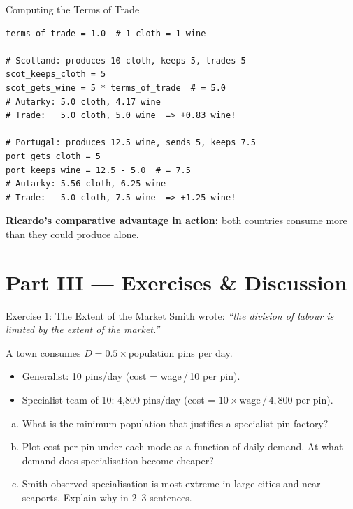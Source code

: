 \documentclass[aspectratio=169, 10pt]{beamer}
\begin{document}
\begin{frame}[fragile]{Computing the Terms of Trade}
\begin{lstlisting}
terms_of_trade = 1.0  # 1 cloth = 1 wine

# Scotland: produces 10 cloth, keeps 5, trades 5
scot_keeps_cloth = 5
scot_gets_wine = 5 * terms_of_trade  # = 5.0
# Autarky: 5.0 cloth, 4.17 wine
# Trade:   5.0 cloth, 5.0 wine  => +0.83 wine!

# Portugal: produces 12.5 wine, sends 5, keeps 7.5
port_gets_cloth = 5
port_keeps_wine = 12.5 - 5.0  # = 7.5
# Autarky: 5.56 cloth, 6.25 wine
# Trade:   5.0 cloth, 7.5 wine  => +1.25 wine!
\end{lstlisting}
\vspace{0.3em}
\textbf{Ricardo's comparative advantage in action:}
both countries consume more than they could produce alone.
\end{frame}

\section{Part III --- Exercises \& Discussion}

\begin{frame}{Exercise 1: The Extent of the Market}
Smith wrote: \textit{``the division of labour is limited by the extent
of the market.''}
\vspace{0.5em}

A town consumes $D = 0.5 \times \text{population}$ pins per day.
\begin{itemize}
  \item Generalist: 10 pins/day (cost = wage\,/\,10 per pin).
  \item Specialist team of 10: 4{,}800 pins/day
        (cost = $10 \times \text{wage}\,/\,4{,}800$ per pin).
\end{itemize}
\vspace{0.3em}
\begin{enumerate}[(a)]
  \item What is the minimum population that justifies a specialist
        pin factory?
  \item Plot cost per pin under each mode as a function of daily
        demand. At what demand does specialisation become cheaper?
  \item Smith observed specialisation is most extreme in large cities
        and near seaports. Explain why in 2--3 sentences.
\end{enumerate}
\end{frame}
\end{document}
